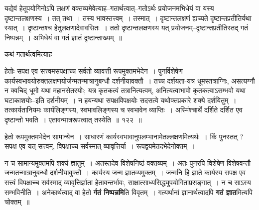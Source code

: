 \documentclass[article,12pt,a4paper]{memoir}
\begin{document}
	यद्येवं हेतूपयोगिनोऽपि लक्षणं वक्तव्यमेवेत्याह--गतार्थत्वात्--गतोऽर्थः प्रयोजनमभिधेयं वा यस्य दृष्टान्तलक्षणस्य । तत् तथा । तस्य भावस्तत्त्वम् । तस्मात् । दृष्टान्तलक्षणं ह्यच्यते दृष्टान्तप्रतीतिर्यथा स्यात् । दृष्टान्तश्च हेतुलक्षणादेवावसितः । ततो दृष्टान्तलक्षणस्य यत् प्रयोजनम्--दृष्टान्तप्रतीतिस्तद् गतं निष्पन्नम् । अभिधेयं वा गतं ज्ञातं दृष्टान्ताख्यम् ॥  
	  
	कथं गतार्थत्वमित्याह--  
	  
	हेतोः सपक्ष एव सत्त्वमसपक्षाच्च सर्वतो व्यावत्ती रूपमुक्तमभेदेन । पुनर्विशेषेण कार्यस्वभावयोरुक्तलक्षणयोर्जन्मतन्मात्रानुबन्धौ दर्शनीयावक्तौ । तच्च दर्शयता-यत्र धूमस्तत्राग्निः, असत्यग्नौ न क्वचिद् धूमो यथा महानसेतरयोः; यत्र कृतकत्वं तत्रानित्यत्वम्, अनित्यत्वाभावो कृतकत्वाऽसम्भवो यथा घटाकाशयोः--इति दर्शनीयम् । न हयन्यथा सपक्षविपक्षयोः सदसत्वे यथोक्तप्रकारे शक्ये दर्शयितुम् । तत्कार्यतानियमः कार्यलिङ्गस्य, स्वभावलिङ्गस्य च स्वभावेन व्याप्तिः । अस्मिंश्चार्थे दर्शिते दर्शित एव दृष्टान्तो भवति । एतावन्मात्ररूपत्वात् तस्येति ॥ १२२ ॥ 
	  
	हेतो रूपमुक्तमभेदेन सामान्येन । साधारणं कार्यस्वभावानुपलम्भानामेतल्लक्षणमित्यर्थः । किं पुनस्तत् ? सपक्ष एव यत् सत्त्वम्, विपक्षाच्च सर्वस्मात् व्यावृत्तिर्या । रूपद्वयमेतदभेदेनोक्तम् ।  
	  
	न च सामान्यमुक्तमपि शक्यं ज्ञातुम् । अतस्तदेव विशेषनिष्ठं वक्तव्यम् । अतः पुनरपि विशेषेण विशेषवन्तौ जन्मतन्मात्रानुबन्धौ दर्शनीयावुक्तौ । कार्यस्य जन्म ज्ञातव्यमुक्तम् । जन्मनि हि ज्ञाते कार्यस्य सपक्ष एव सत्त्वं विपक्षाच्च सर्वस्माद् व्यावृत्तिर्ज्ञाता हेतावन्तर्भावः, साक्षात्साध्यसिद्ध्युपयोगिताप्रसङ्गात् । न च साऽस्य सम्भविनीति । अनेकार्थत्वाद् वा हेतो  \textbf{र्गतं निष्पन्नमि}ति विवृतम् । गत्यर्थानां ज्ञानार्थत्वादपि \textbf{गतं ज्ञात}मित्यपि चोक्तम् ॥
	\pend
      
\end{document}
